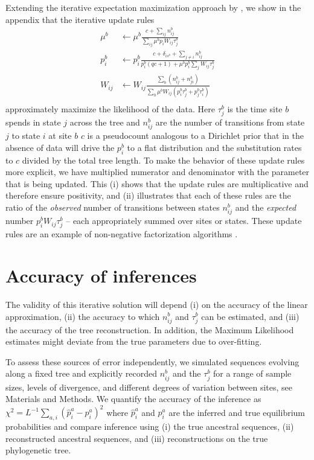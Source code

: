 \documentclass[aps,rmp,twocolumn]{revtex4}
\newcommand{\eqp}{p}
\newcommand{\pc}{c}
\begin{document}
Extending the iterative expectation maximization approach by \citet{bruno1996modeling}, we show in the appendix that the iterative update rules
\begin{equation}
\label{eq:update}
	\begin{split}
		\mu^b & \leftarrow \mu^b\frac{\pc+\sum_{ij} n^b_{ij}}{\sum_{ij}\mu^b \eqp_{i}W_{ij}\tau_j^b} \\
		\eqp^b_i & \leftarrow \eqp^b_i\frac{\pc+\delta_{is^{b}} + \sum_{j\neq i} n^b_{ij}}{\eqp^b_i(q\pc+1) + \mu^b\eqp^b_i \sum_{j}W_{ij}\tau_j^b} \\
		W_{ij} & \leftarrow W_{ij}\frac{\sum_b (n^b_{ij}+n^b_{ji})}{\sum_b \mu^b W_{ij}(\eqp_i^b\tau_j^b + \eqp_j^b \tau_i^b)} \\
	\end{split}
\end{equation}
approximately maximize the likelihood of the data.
Here $\tau^b_j$ is the time site $b$ spends in state $j$ across the tree and $n^b_{ij}$ are the number of transitions from state $j$ to state $i$ at site $b$
$\pc$ is a pseudocount analogous to a Dirichlet prior that in the absence of data will drive the $\eqp_i^b$ to a flat distribution and the substitution rates to $\pc$ divided by the total tree length.
To make the behavior of these update rules more explicit, we have multiplied numerator and denominator with the parameter that is being updated. This (i) shows that the update rules are multiplicative and therefore ensure positivity, and (ii) illustrates that each of these rules are the ratio of the {\it observed} number of transitions between states $n^b_{ij}$ and the {\it expected} number $\eqp^b_i W_{ij}\tau_j^b$ -- each appropriately summed over sites or states.
These update rules are an example of non-negative factorization algorithms \citep{lee_algorithms_2001}.

\section*{Accuracy of inferences}
The validity of this iterative solution will depend (i) on the accuracy of the linear approximation, (ii) the accuracy to which $n_{ij}^b$ and $\tau_{j}^b$ can be estimated, and (iii) the accuracy of the tree reconstruction.
In addition, the Maximum Likelihood estimates might deviate from the true parameters due to over-fitting.

To assess these sources of error independently, we simulated sequences evolving along a fixed tree and explicitly recorded $n_{ij}^b$ and the $\tau_j^b$ for a range of sample sizes, levels of divergence, and different degrees of variation between sites, see Materials and Methods.
We quantify the accuracy of the inference as $\chi^2 = L^{-1}\sum_{a,i}(\hat{\eqp}_i^a - \eqp_i^a)^2$ where $\hat{\eqp}_i^a$ and $\eqp_i^a$ are the inferred and true equilibrium probabilities and compare inference using (i) the true ancestral sequences, (ii) reconstructed ancestral sequences, and (iii) reconstructions on the true phylogenetic tree.
\end{document}
